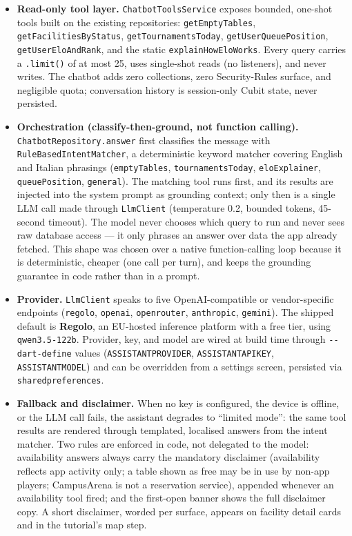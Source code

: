 \documentclass{configurations/polimi3i_thesis}
\renewcommand{\_}{\textunderscore\allowbreak}
\begin{document}
\begin{itemize}
    \item \textbf{Read-only tool layer.} \texttt{ChatbotToolsService} exposes bounded, one-shot tools built on the existing repositories: \texttt{getEmptyTables}, \texttt{getFacilitiesByStatus}, \texttt{getTournamentsToday}, \texttt{getUserQueuePosition}, \texttt{getUserEloAndRank}, and the static \texttt{explainHowEloWorks}. Every query carries a \texttt{.limit()} of at most 25, uses single-shot reads (no listeners), and never writes. The chatbot adds zero collections, zero Security-Rules surface, and negligible quota; conversation history is session-only Cubit state, never persisted.
    \item \textbf{Orchestration (classify-then-ground, not function calling).}\\ \texttt{ChatbotRepository.answer} first classifies the message with \texttt{RuleBasedIntentMatcher}, a deterministic keyword matcher covering English and Italian phrasings (\texttt{emptyTables}, \texttt{tournamentsToday}, \texttt{eloExplainer}, \texttt{queuePosition}, \texttt{general}). The matching tool runs first, and its results are injected into the system prompt as grounding context; only then is a single LLM call made through \texttt{LlmClient} (temperature 0.2, bounded tokens, 45-second timeout). The model never chooses which query to run and never sees raw database access — it only phrases an answer over data the app already fetched. This shape was chosen over a native function-calling loop because it is deterministic, cheaper (one call per turn), and keeps the grounding guarantee in code rather than in a prompt.
    \item \textbf{Provider.} \texttt{LlmClient} speaks to five OpenAI-compatible or vendor-specific endpoints (\texttt{regolo}, \texttt{openai}, \texttt{openrouter}, \texttt{anthropic}, \texttt{gemini}). The shipped default is \textbf{Regolo}, an EU-hosted inference platform with a free tier, using \texttt{qwen3.5-122b}. Provider, key, and model are wired at build time through \texttt{-{}-dart-define} values (\texttt{ASSISTANT\_PROVIDER}, \texttt{ASSISTANT\_API\_KEY}, \texttt{ASSISTANT\_MODEL}) and can be overridden from a settings screen, persisted via \texttt{shared\_preferences}.
    \item \textbf{Fallback and disclaimer.} When no key is configured, the device is offline, or the LLM call fails, the assistant degrades to ``limited mode'': the same tool results are rendered through templated, localised answers from the intent matcher. Two rules are enforced in code, not delegated to the model: availability answers always carry the mandatory disclaimer (availability reflects app activity only; a table shown as free may be in use by non-app players; CampusArena is not a reservation service), appended whenever an availability tool fired; and the first-open banner shows the full disclaimer copy. A short disclaimer, worded per surface, appears on facility detail cards and in the tutorial's map step.
\end{itemize}
\end{document}
